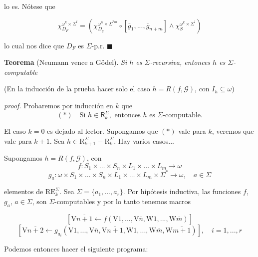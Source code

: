 \documentclass{article}
\begin{document}
lo es. Nótese que

\[
\chi_{D_F}^{\omega^k \times \Sigma^l} = \left( \chi_{D_g}^{\omega^n \times \Sigma^{*m}} \circ [\bar{g}_1, ..., \bar{g}_{n+m}]  \land \chi_S^{\omega^k \times \Sigma^l}\right)
\]

lo cual nos dice que $D_F$ es $\Sigma$-p.r. \hfill $\blacksquare$

\bigskip

\textbf{Teorema} (Neumann vence a Gödel). \textit{Si $h$ es $\Sigma$-recursiva, entonces $h$ es $\Sigma$-computable}

\medskip

(En la inducción de la prueba hacer solo el caso $h = R(f, \mathcal{G})$, con $I_h \subseteq \omega$)
\medskip

\textit{proof.}
Probaremos por inducción en $k$ que
\[
(*) \quad \text{Si } h \in \mathsf{R}_k^{\Sigma}, \text{ entonces } h \text{ es } \Sigma\text{-computable}.
\]

El caso $k = 0$ es dejado al lector. Supongamos que $(*)$ vale para $k$, veremos que vale para $k + 1$. Sea $h \in \text{R}_{k+1}^{\Sigma} - \text{R}_k^{\Sigma}$. Hay varios casos...

Supongamos $h = R(f, \mathcal{G})$, con
\[
f : S_1 \times \ldots \times S_n \times L_1 \times \ldots \times L_m \to \omega
\]
\[
g_a : \omega \times S_1 \times \ldots \times S_n \times L_1 \times \ldots \times L_m \times \Sigma^* \to \omega, \quad a \in \Sigma
\]

elementos de $\text{RE}^\Sigma_k$. Sea $\Sigma = \{a_1, ..., a_r\}$. Por hipótesis inductiva, las funciones $f$, $g_a$, $a \in \Sigma$, son $\Sigma$-computables y por lo tanto tenemos macros

\[
[\text{V}\overline{n+1} \gets f(\text{V}1, ..., \text{V}\overline{n}, \text{W}1, ..., \text{W}\overline{m})]
\]
\[
[\text{V}\overline{n+2} \gets g_{a_i}(\text{V}1, ..., \text{V}\overline{n}, \text{V}\overline{n+1}, \text{W}1, ..., \text{W}\overline{m}, \text{W}\overline{m+1})], \quad i = 1, ..., r
\]

\bigskip

Podemos entonces hacer el siguiente programa:
\end{document}
